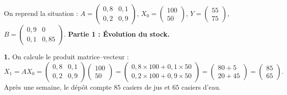 \documentclass[11pt]{article}
\begin{document}
\begin{exoresolu}
On reprend la situation : $A = \begin{pmatrix} 0,8 & 0,1 \\ 0,2 & 0,9 \end{pmatrix}$, $X_0 = \begin{pmatrix} 100 \\ 50 \end{pmatrix}$, $Y = \begin{pmatrix} 55 \\ 75 \end{pmatrix}$, $B = \begin{pmatrix} 0,9 & 0 \\ 0,1 & 0,85 \end{pmatrix}$.
\tcblower
\textbf{Partie 1 : Évolution du stock.}

\textbf{1.} On calcule le produit matrice--vecteur :
\[
X_1 = A X_0 = \begin{pmatrix} 0,8 & 0,1 \\ 0,2 & 0,9 \end{pmatrix} \begin{pmatrix} 100 \\ 50 \end{pmatrix}
= \begin{pmatrix} 0,8 \times 100 + 0,1 \times 50 \\ 0,2 \times 100 + 0,9 \times 50 \end{pmatrix}
= \begin{pmatrix} 80 + 5 \\ 20 + 45 \end{pmatrix} = \begin{pmatrix} 85 \\ 65 \end{pmatrix}.
\]
Après une semaine, le dépôt compte $85$ casiers de jus et $65$ casiers d'eau.


\end{exoresolu}
\end{document}
